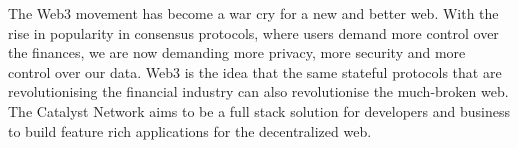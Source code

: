 The Web3 movement has become a war cry for a new and better web. With the rise in popularity in consensus protocols, where users demand more control over the finances, we are now demanding more privacy, more security and more control over our data. Web3 is the idea that the same stateful protocols that are revolutionising the financial industry can also revolutionise the much-broken web. The Catalyst Network aims to be a full stack solution for developers and business to build feature rich applications for the decentralized web.